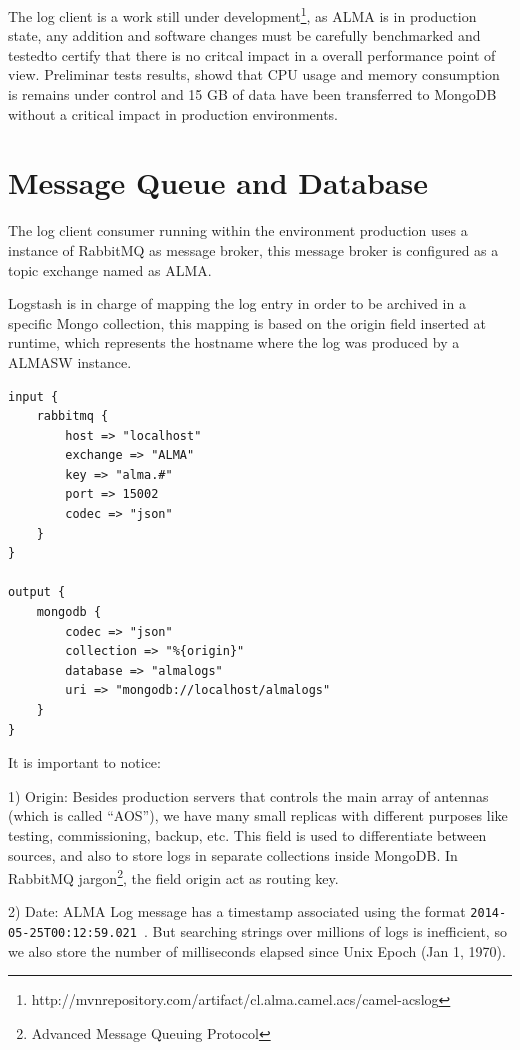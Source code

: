 \documentclass[]{spie}  %
\begin{document}
The log client is a work still under 
development\footnote{http://mvnrepository.com/artifact/cl.alma.camel.acs/camel-acslog}, 
as ALMA is in production state, any addition and software changes must be carefully 
benchmarked and testedto certify that there is no critcal impact in a overall 
performance point of view. Preliminar tests results, showd that CPU usage and 
memory consumption is remains under control and 15 GB of data have been transferred 
to MongoDB without a critical impact in production environments.


\section{Message Queue and Database}
The log client consumer running within the environment production uses a instance 
of RabbitMQ as message broker, this message broker is configured as a topic 
exchange named as ALMA.

Logstash is in charge of mapping the log entry in order to be archived in a 
specific Mongo collection, this mapping is based on the origin field inserted at 
runtime, which represents the hostname where the log was produced by a ALMASW 
instance.\\

{\small
\begin{verbatim}
input {
    rabbitmq {
        host => "localhost"
        exchange => "ALMA"
        key => "alma.#"
        port => 15002
        codec => "json"
    }
}

output {
    mongodb {
        codec => "json"
        collection => "%{origin}"
        database => "almalogs"
        uri => "mongodb://localhost/almalogs"
    }
}
\end{verbatim}
}

It is important to notice:

1)  Origin: Besides production servers that controls the main array of antennas
(which is called ``AOS''), we have many small replicas with different
purposes like testing, commissioning, backup, etc. This field is used to
differentiate between sources, and also to store logs in separate collections
inside MongoDB. In RabbitMQ jargon\footnote{Advanced Message Queuing Protocol}, 
the field origin act as routing key.  

2) Date: ALMA Log message has a timestamp associated using the format
{\tt 2014-05-25T00:12:59.021 }. But searching strings over millions of logs
is inefficient, so we also store the number of milliseconds elapsed since Unix
Epoch (Jan 1, 1970).
\end{document}
